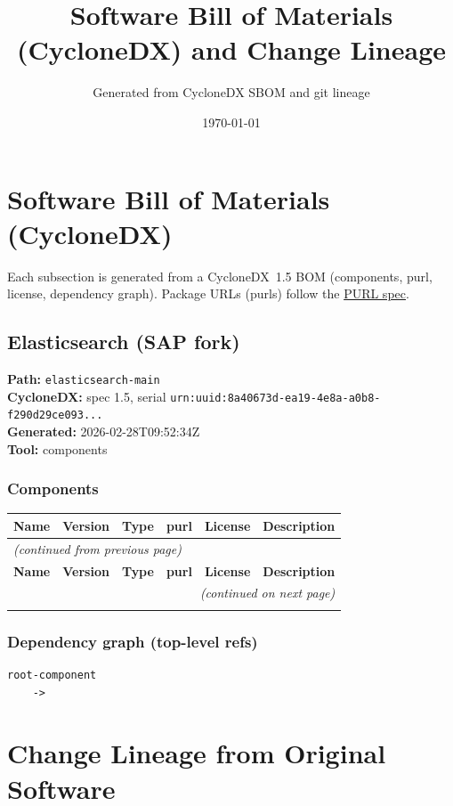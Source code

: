 \documentclass[11pt,a4paper]{article}
\title{\textbf{Software Bill of Materials (CycloneDX) and Change Lineage}}
\author{Generated from CycloneDX SBOM and git lineage}
\date{\today}
\begin{document}
\maketitle
\tableofcontents
\newpage
\section{Software Bill of Materials (CycloneDX)}
Each subsection is generated from a CycloneDX~1.5 BOM (components, purl, license, dependency graph). Package URLs (purls) follow the \href{https://github.com/package-url/purl-spec}{PURL spec}.

\subsection{Elasticsearch (SAP fork)}
\textbf{Path:} \texttt{elasticsearch-main}
\\ \textbf{CycloneDX:} spec 1.5, serial \texttt{urn:uuid:8a40673d-ea19-4e8a-a0b8-f290d29ce093...}
\\ \textbf{Generated:} 2026-02-28T09:52:34Z
\\ \textbf{Tool:} components

\subsubsection*{Components}
\begin{longtable}{|p{4cm}|p{2cm}|p{1.6cm}|p{5cm}|p{1.5cm}|p{3.5cm}|}
\toprule
\rowcolor{sbomhdr}\textbf{Name} & \textbf{Version} & \textbf{Type} & \textbf{purl} & \textbf{License} & \textbf{Description} \\
\midrule
\endfirsthead
\multicolumn{6}{l}{\small\itshape (continued from previous page)} \\
\toprule
\rowcolor{sbomhdr}\textbf{Name} & \textbf{Version} & \textbf{Type} & \textbf{purl} & \textbf{License} & \textbf{Description} \\
\midrule
\endhead
\midrule
\multicolumn{6}{r}{\small\itshape (continued on next page)} \\
\endfoot
\bottomrule
\endlastfoot
\end{longtable}

\subsubsection*{Dependency graph (top-level refs)}
\begin{lstlisting}[style=depgraph]
  root-component
    -> 
\end{lstlisting}

\newpage
\section{Change Lineage from Original Software}
\end{document}
